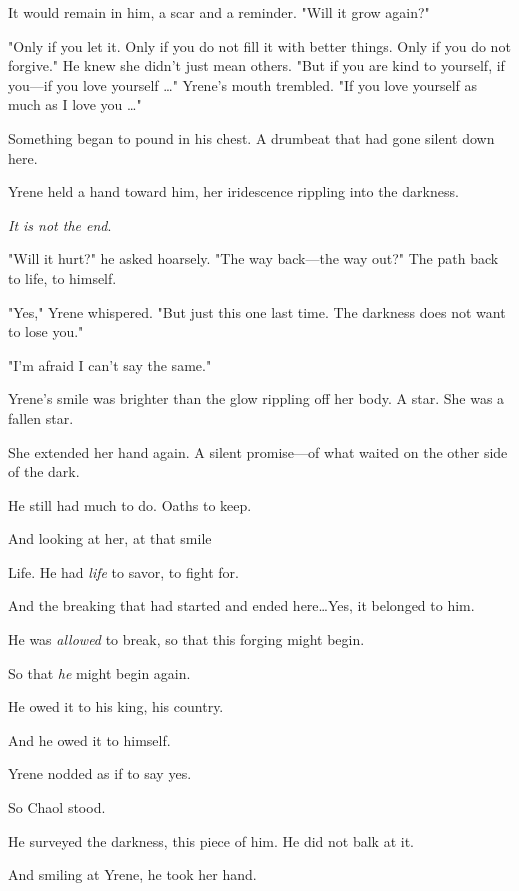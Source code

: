 It would remain in him, a scar and a reminder.
"Will it grow again?"

"Only if you let it.
Only if you do not fill it with better things.
Only if you do not forgive."
He knew she didn't just mean others.
"But if you are kind to yourself, if you---if you love yourself \ldots" Yrene's mouth trembled.
"If you love yourself as much as I love you \ldots"

Something began to pound in his chest.
A drumbeat that had gone silent down here.

Yrene held a hand toward him, her iridescence rippling into the darkness.

\emph{It is not the end}.

"Will it hurt?"
he asked hoarsely.
"The way back---the way out?"
The path back to life, to himself.

"Yes," Yrene whispered.
"But just this one last time.
The darkness does not want to lose you."

"I'm afraid I can't say the same."

Yrene's smile was brighter than the glow rippling off her body.
A star.
She was a fallen star.

She extended her hand again.
A silent promise---of what waited on the other side of the dark.

He still had much to do.
Oaths to keep.

And looking at her, at that smile 

Life.
He had \emph{life} to savor, to fight for.

And the breaking that had started and ended here\ldots Yes, it belonged to him.

He was \emph{allowed} to break, so that this forging might begin.

So that \emph{he} might begin again.

He owed it to his king, his country.

And he owed it to himself.

Yrene nodded as if to say yes.

So Chaol stood.

He surveyed the darkness, this piece of him.
He did not balk at it.

And smiling at Yrene, he took her hand.

